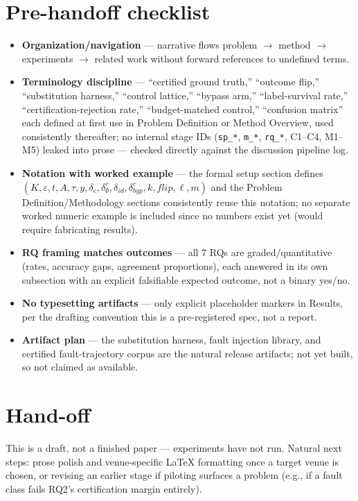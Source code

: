 \documentclass[11pt]{article}
\begin{document}
\section*{Pre-handoff checklist}
\begin{itemize}[leftmargin=1.4em]
\item \textbf{Organization/navigation} --- narrative flows problem $\to$ method $\to$ experiments $\to$ related work without forward references to undefined terms.
\item \textbf{Terminology discipline} --- ``certified ground truth,'' ``outcome flip,'' ``substitution harness,'' ``control lattice,'' ``bypass arm,'' ``label-survival rate,'' ``certification-rejection rate,'' ``budget-matched control,'' ``confusion matrix'' each defined at first use in Problem Definition or Method Overview, used consistently thereafter; no internal stage IDs (\texttt{sp\_*}, \texttt{m\_*}, \texttt{rq\_*}, C1--C4, M1--M5) leaked into prose --- checked directly against the discussion pipeline log.
\item \textbf{Notation with worked example} --- the formal setup section defines $(K, \varepsilon, t, A, \tau, y, \delta_c, \delta_\emptyset^c, \delta_{id}, \delta_{byp}^c, k, flip, \ell, m)$ and the Problem Definition/Methodology sections consistently reuse this notation; no separate worked numeric example is included since no numbers exist yet (would require fabricating results).
\item \textbf{RQ framing matches outcomes} --- all 7 RQs are graded/quantitative (rates, accuracy gaps, agreement proportions), each answered in its own subsection with an explicit falsifiable expected outcome, not a binary yes/no.
\item \textbf{No typesetting artifacts} --- only explicit placeholder markers in Results, per the drafting convention this is a pre-registered spec, not a report.
\item \textbf{Artifact plan} --- the substitution harness, fault injection library, and certified fault-trajectory corpus are the natural release artifacts; not yet built, so not claimed as available.
\end{itemize}

\section*{Hand-off}
This is a draft, not a finished paper --- experiments have not run. Natural next steps: prose polish and venue-specific LaTeX formatting once a target venue is chosen, or revising an earlier stage if piloting surfaces a problem (e.g., if a fault class fails RQ2's certification margin entirely).



\end{document}
